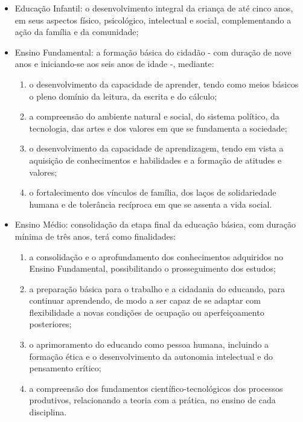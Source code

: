 \begin{itemize}
	\item Educação Infantil: o desenvolvimento integral da criança de até cinco anos, em seus aspectos físico, psicológico, intelectual e social, complementando a ação da família e da comunidade;
	\item Ensino Fundamental: a formação básica do cidadão - com duração de nove anos e iniciando-se aos seis anos de idade -, mediante:

	\begin{enumerate}
\item o desenvolvimento da capacidade de aprender, tendo como meios básicos o pleno domínio da leitura, da escrita e do cálculo;
\item a compreensão do ambiente natural e social, do sistema político, da tecnologia, das artes e dos valores em que se fundamenta a sociedade;
\item o desenvolvimento da capacidade de aprendizagem, tendo em vista a aquisição de conhecimentos e habilidades e a formação de atitudes e valores;
\item o fortalecimento dos vínculos de família, dos laços de solidariedade humana e de tolerância recíproca em que se assenta a vida social.
	\end{enumerate}

	\item Ensino Médio: consolidação da etapa final da educação básica, com duração mínima de três anos, terá como finalidades:

	\begin{enumerate}
		\item a consolidação e o aprofundamento dos conhecimentos adquiridos no Ensino Fundamental, possibilitando o prosseguimento dos estudos;
\item a preparação básica para o trabalho e a cidadania do educando, para continuar aprendendo, de modo a ser capaz de se adaptar com flexibilidade a novas condições de ocupação ou aperfeiçoamento posteriores;
\item o aprimoramento do educando como pessoa humana, incluindo a formação ética e o desenvolvimento da autonomia intelectual e do pensamento crítico;
\item a compreensão dos fundamentos científico-tecnológicos dos processos produtivos, relacionando a teoria com a prática, no ensino de cada disciplina.

	\end{enumerate}
\end{itemize}

